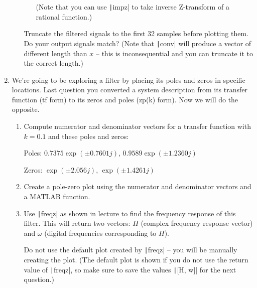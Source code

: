\documentclass{article}
\begin{document}
\begin{enumerate}
\begin{enumerate}
\begin{enumerate}
      (Note that you can use \texttt|impz| to take inverse Z-transform of a rational function.)
    \end{enumerate}
    Truncate the filtered signals to the first 32 samples before plotting them. Do your output signals match? (Note that \texttt|conv| will produce a vector of different length than $x$ -- this is inconsequential and you can truncate it to the correct length.)
  \end{enumerate}

\item We're going to be exploring a filter by placing its poles and zeros in specific locations. Last question you converted a system description from its transfer function (tf form) to its zeros and poles (zp(k) form). Now we will do the opposite.
  \begin{enumerate}
  \item Compute numerator and denominator vectors for a transfer function with $k=0.1$ and these poles and zeros:

    Poles: $0.7375\exp(\pm0.7601j)$, $0.9589\exp(\pm1.2360j)$

    Zeros: $\exp(\pm2.056j)$, $\exp(\pm1.4261j)$

  \item Create a pole-zero plot using the numerator and denominator vectors and a MATLAB function.

  \item Use \texttt|freqz| as shown in lecture to find the frequency response of this filter. This will return two vectors: $H$ (complex frequency response vector) and $\omega$ (digital frequencies corresponding to $H$).

    Do not use the default plot created by \texttt|freqz| -- you will be manually creating the plot. (The default plot is shown if you do not use the return value of \texttt|freqz|, so make sure to save the values \texttt|[H, w]| for the next question.)


\end{enumerate}
\end{enumerate}
\end{document}

